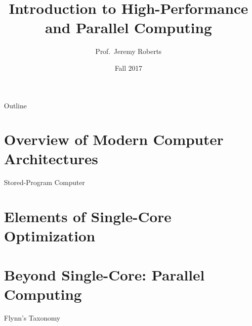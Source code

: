 \documentclass[10pt]{beamer}
\title %
[C++ and Fortran]{Introduction to High-Performance and Parallel Computing}
\author[Roberts]{Prof.~Jeremy Roberts}
\date
{Fall 2017}
\begin{document}
\begin{frame}[plain]
  \titlepage
\end{frame}

\begin{frame}{Outline}
  \tableofcontents
\end{frame}


\section{Overview of Modern Computer Architectures}

\begin{frame}{Stored-Program Computer}




\end{frame}


\section{Elements of Single-Core Optimization}


\section{Beyond Single-Core: Parallel Computing}


\begin{frame}{Flynn's Taxonomy}



\end{frame}
\end{document}
